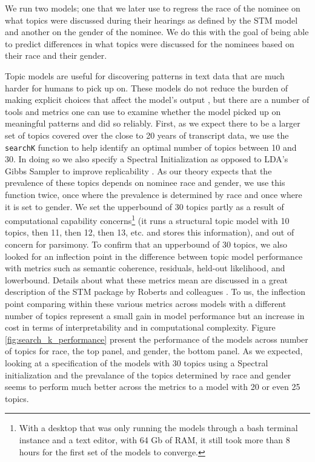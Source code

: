 \documentclass [12pt]{article}
\begin{document}
We run two models; one that we later use to regress the race of the nominee on what topics were discussed during their hearings as defined by the STM model and another on the gender of the nominee. We do this with the goal of being able to predict differences in what topics were discussed for the nominees based on their race and their gender. 

Topic models are useful for discovering patterns in text data that are much harder for humans to pick up on. These models do not reduce the burden of making explicit choices that affect the model's output \citep{grimmer_et-al_2022}, but there are a number of tools and metrics one can use to examine whether the model picked up on meaningful patterns and did so reliably. First, as we expect there to be a larger set of topics covered over the close to 20 years of transcript data, we use the \verb|searchK| function to help identify an optimal number of topics between 10 and 30. In doing so we also specify a Spectral Initialization as opposed to LDA's Gibbs Sampler to improve replicability \citep[see][]{roberts_et-al_2019}. As our theory expects that the prevalence of these topics depends on nominee race and gender, we use this function twice, once where the prevalence is determined by race and once where it is set to gender. We set the upperbound of 30 topics partly as a result of computational capability concerns\footnote{With a desktop that was only running the models through a bash terminal instance and a text editor, with 64 Gb of RAM, it still took more than 8 hours for the first set of the models to converge.} (it runs a structural topic model with 10 topics, then 11, then 12, then 13, etc. and stores this information), and out of concern for parsimony. To confirm that an upperbound of 30 topics, we also looked for an inflection point in the difference between topic model performance with metrics such as semantic coherence, residuals, held-out likelihood, and lowerbound. Details about what these metrics mean are discussed in a great description of the STM package by Roberts and colleagues \citep[see][]{roberts_et-al_2019}. To us, the inflection point comparing within these various metrics across models with a different number of topics represent a small gain in model performance but an increase in cost in terms of interpretability and in computational complexity. Figure \ref{fig:search_k_performance} present the performance of the models across number of topics for race, the top panel, and gender, the bottom panel. As we expected, looking at a specification of the models with 30 topics using a Spectral initialization and the prevalance of the topics determined by race and gender seems to perform much better across the metrics to a model with 20 or even 25 topics. 
\end{document}
